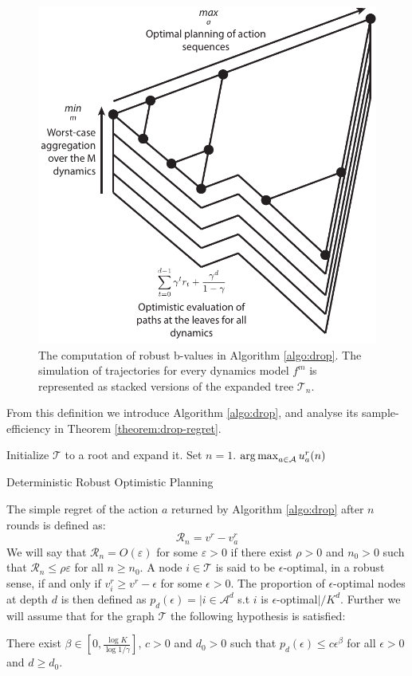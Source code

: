 \documentclass{article}
\begin{document}
\begin{figure}
\centering
\includegraphics[width=0.3\linewidth]{img/robust-control-tree}
\caption{The computation of robust b-values in Algorithm \ref{algo:drop}. The simulation of trajectories for every dynamics model $f^m$ is represented as stacked versions of the expanded tree $\mathcal{T}_n$.}
\label{fig:drop}
\end{figure}

From this definition we introduce Algorithm \ref{algo:drop}, and analyse its sample-efficiency in Theorem \ref{theorem:drop-regret}.

\begin{algorithm}[tp]
\DontPrintSemicolon
Initialize $\mathcal{T}$ to a root and expand it. Set $n=1$.\;
\Return $\operatorname*{arg\,max}_{a\in \mathcal{A}} u^r_a(n)$
\caption{Deterministic Robust Optimistic Planning}
\label{algo:drop}
\end{algorithm}

The simple regret of the action $a$ returned by Algorithm \ref{algo:drop} after $n$ rounds is defined as:
\begin{equation}
\mathcal{R}_n = v^r - v_a^r
\end{equation}
We will say that $\mathcal{R}_n=O(\varepsilon)$ for some $\varepsilon>0$ if there exist $\rho>0$ and $n_0>0$ such that $\mathcal{R}_n\leq\rho\varepsilon$ for all $n\geq n_0$.
A node $i\in\mathcal{T}$ is said to be $\epsilon$-optimal, in a robust sense, if and only if $v_i^r \geq v^r - \epsilon$ for some $\epsilon > 0$. The proportion of $\epsilon$-optimal nodes at depth $d$ is then defined as $p_d(\epsilon) = |i \in \mathcal{A}^d$ s.t $i$ is $\epsilon$-optimal$|/K^d$. Further we will assume that for the graph $\mathcal{T}$ the following hypothesis is satisfied:
\begin{assumption}
\label{assumpt:beta}
There exist $\beta\in[0, \frac{\log K}{\log 1/\gamma}]$, $c > 0$ and $d_0 > 0$ such that $p_d(\epsilon)\leq c\epsilon^\beta$ for all $\epsilon > 0$ and $d\geq d_0$.
\end{assumption}
\end{document}
